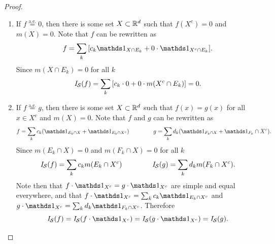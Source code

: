 \documentclass[hw_all.tex]{subfiles}
\begin{document}
\begin{proof}
\begin{enumerate}
            Suppose now that $\sint(f) < \infty$. Then
            \[
               \sint(f) = \sum_k c_k m(E_k) < \infty
            .\]
            If $f$ was not finite almost everywhere, then there would be a set $A$ with $m(A) > 0$ such that $f(x) = \infty$ for $x \in A$. Let $A_E = \qty{E_k : A \cap E_k \neq \varnothing}$ and note that $A_E$ is non empty and its union is $A$. Therefore $\sum_{E_k \in A_E} c_k E_k = \infty$, meaning the integral of $f$ is not finite, a contradiction. Assume then $f$ is not supported on a set of finite measure. Then there must exist some $c = \min\qty{c_k : c_k > 0}$. Note then that
            \[
                c \sum_k m(E_k) < \sum_{k} c_k m(E_k)
            \]
            but $\sum_k m(E_k) = m([f \neq 0]) = \infty$, hence $\sint(f)$ is not finite, a contradiction.
        \item
            If $f \overset{\text{a.e.}}{=} 0$, then there is some set $X \subset \mathbb{R}^d$ such that $f(X^c) = \qty{0}$ and $m(X) = 0$. Note that $f$ can be rewritten as
            \[
                f = \sum_{k} \qty[c_k \ind{X \cap E_k} + 0 \cdot \ind{X^c \cap E_k}]
            .\]
            Since $m(X \cap E_k) = 0$ for all $k$
            \[
                \mathit{I}_{\mathcal{S}}(f) = \sum_{k} \qty[ c_k \cdot 0 + 0 \cdot m(X^c \cap E_k) ] = 0
            .\]
        \item
            If $f \overset{\text{a.e.}}{=} g$, then there is some set $X \subset \mathbb{R}^d$ such that $f(x) = g(x)$ for all $x \in X^c$ and $m(X) = 0$. Note that $f$ and $g$ can be rewritten as
            \[
                f = \sum_{k} c_k \qty(\ind{E_k \cap X} + \ind{E_k \cap X^c}) \hspace{1.5cm} g = \sum_{k} d_k \qty(\ind{F_k \cap X} + \ind{F_k} \cap X^c)
            .\]
            Since $m(E_k \cap X) = 0$ and $m(F_k \cap X) = 0$ for all $k$
            \[
                \mathit{I}_{\mathcal{S}}(f) = \sum_k c_k m(E_k \cap X^c) \hspace{1.5cm} \mathit{I}_{\mathcal{S}}(g) = \sum_k d_k m(F_k \cap X^c)
            .\]
            Note then that $f \cdot \ind{X^c} = g \cdot \ind{X^c}$ are simple and equal everywhere, and that $f \cdot \ind{X^c} = \sum_k c_k \ind{E_k \cap X^c}$ and $g \cdot \ind{X^c} = \sum_k d_k \ind{F_k \cap X^c}$. Therefore
            \[
                \sint(f) = \sint(f \cdot \ind{X^c}) = \sint(g \cdot \ind{X^c}) = \sint(g)
            .\]


\end{enumerate}
\end{proof}
\end{document}
